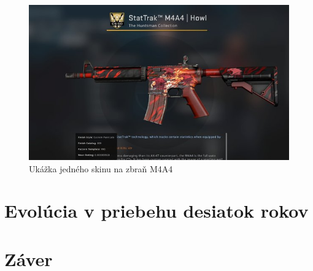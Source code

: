 \documentclass[10pt,oneside,slovak,a4paper]{article}
\begin{document}
\begin{figure}[tbh]
\centering
\includegraphics[scale=0.45]{skin.jpg}
\caption{Ukážka jedného skinu na zbraň M4A4}
\label{f:skiny}
\end{figure}


\section{Evolúcia v priebehu desiatok rokov} \label{evolucia}




\section{Záver} \label{zaver} %


%






\end{document}
